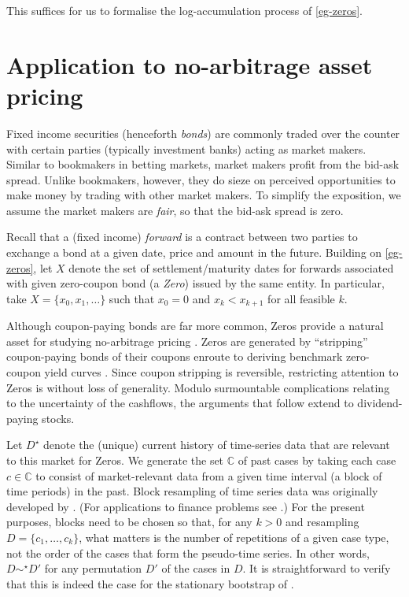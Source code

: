 \documentclass[12pt,a4paper,twoside]{article}
\newcommand{\mbbc}{{\mathds C}}
\newcommand{\past}{{D^\star}}
\begin{document}
This suffices for us to formalise the log-accumulation process of
\cref{eg-zeros}.

\section{Application to no-arbitrage asset pricing}\label{sec-fin-app} Fixed
income securities (henceforth \emph{bonds}) are commonly traded over the
counter with certain parties (typically investment banks) acting as market
makers. Similar to bookmakers in betting markets, market makers profit from the
bid-ask spread. Unlike bookmakers, however, they do sieze on perceived
opportunities to make money by trading with other market makers. To simplify
the exposition, we assume the market makers are \emph{fair}, so that the
bid-ask spread is zero.

Recall that a (fixed income) \emph{forward} is a contract between two parties
to exchange a bond at a given date, price and amount in the future.  Building
on \cref{eg-zeros}, let $X$ denote the set of settlement/maturity dates for
forwards associated with given zero-coupon bond (a \emph{Zero}) issued by the
same entity. In particular, take $X = \{x_0, x_1, \dots\}$ such that $x_0 = 0$
and $x_k < x_{k + 1}$ for all feasible $k$. 
\begin{remark*}
  Although coupon-paying bonds are far more common, Zeros provide a natural
  asset for studying no-arbitrage pricing \citep{barillas2019speculation}.
  Zeros are generated by ``stripping'' coupon-paying bonds of their coupons
  enroute to deriving benchmark zero-coupon yield curves
  \citep{brealey2020principles}. Since coupon stripping is reversible,
  restricting attention to Zeros is without loss of generality. Modulo
  surmountable complications relating to the uncertainty of the cashflows, the
  arguments that follow extend to dividend-paying stocks.
\end{remark*}

Let $\past$ denote the (unique) current history of time-series data that are
relevant to this market for Zeros.  We generate the set $\mbbc$ of past cases
by taking each case $c \in \mbbc$ to consist of market-relevant data from a
given time interval (a block of time periods) in the past. Block resampling of
time series data was originally developed by
\citet{kunsch1989jackknife,politis1994stationary}. (For applications to
finance problems see \citet{white2000reality,harvey2021lucky}.) For the
present purposes, blocks need to be chosen so that, for any $k > 0$ and
resampling $D = \{c_1, \dots, c_k\}$, what matters is the number of repetitions
of a given case type, not the order of the cases that form the pseudo-time
series. In other words, $D \sim^\star D'$ for any permutation $D'$ of the cases
in $D$.  It is straightforward to verify that this is indeed the case for the
stationary bootstrap of \citet[section 2]{politis1994stationary}.
\end{document}
